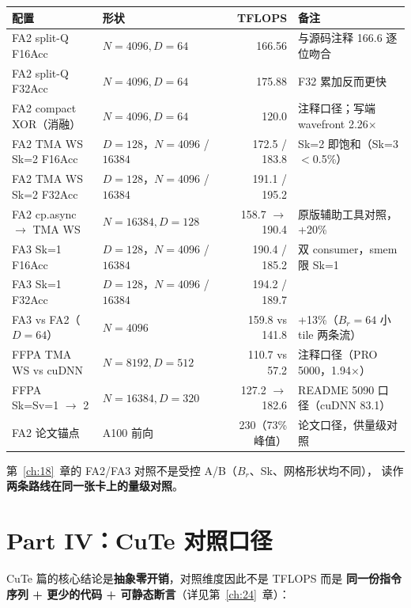 \begin{center}\small
\begin{tabular}{lp{3.4cm}rp{4.6cm}}
\toprule
配置 & 形状 & TFLOPS & 备注 \\
\midrule
FA2 split-Q F16Acc & $N{=}4096, D{=}64$ & 166.56 & 与源码注释 166.6 逐位吻合 \\
FA2 split-Q F32Acc & $N{=}4096, D{=}64$ & 175.88 & F32 累加反而更快 \\
FA2 compact XOR（消融） & $N{=}4096, D{=}64$ & 120.0 & 注释口径；写端 wavefront 2.26$\times$ \\
FA2 TMA WS Sk=2 F16Acc & $D{=}128$，$N{=}4096$ / $16384$ & 172.5 / 183.8 & Sk=2 即饱和（Sk=3 $<$0.5\%） \\
FA2 TMA WS Sk=2 F32Acc & $D{=}128$，$N{=}4096$ / $16384$ & 191.1 / 195.2 & \\
FA2 cp.async $\to$ TMA WS & $N{=}16384, D{=}128$ & 158.7 $\to$ 190.4 & 原版辅助工具对照，+20\% \\
FA3 Sk=1 F16Acc & $D{=}128$，$N{=}4096$ / $16384$ & 190.4 / 185.2 & 双 consumer，smem 限 Sk=1 \\
FA3 Sk=1 F32Acc & $D{=}128$，$N{=}4096$ / $16384$ & 194.2 / 189.7 & \\
FA3 vs FA2（$D{=}64$） & $N{=}4096$ & 159.8 vs 141.8 & +13\%（$B_r{=}64$ 小 tile 两条流） \\
FFPA TMA WS vs cuDNN & $N{=}8192, D{=}512$ & 110.7 vs 57.2 & 注释口径（PRO 5000，1.94$\times$） \\
FFPA Sk=Sv=1 $\to$ 2 & $N{=}16384, D{=}320$ & 127.2 $\to$ 182.6 & README 5090 口径（cuDNN 83.1） \\
FA2 论文锚点 & A100 前向 & 230（73\% 峰值） & 论文口径，供量级对照 \\
\bottomrule
\end{tabular}
\end{center}

第~\ref{ch:18}~章的 FA2/FA3 对照不是受控 A/B（$B_r$、Sk、网格形状均不同），
读作\textbf{两条路线在同一张卡上的量级对照}。

\section{Part IV：CuTe 对照口径}

CuTe 篇的核心结论是\textbf{抽象零开销}，对照维度因此不是 TFLOPS 而是
\textbf{同一份指令序列 + 更少的代码 + 可静态断言}（详见第~\ref{ch:24}~章）：

